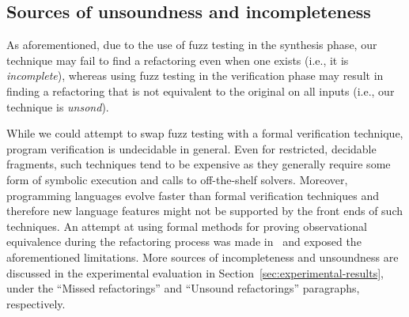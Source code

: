\documentclass[sigconf,review,anonymous]{acmart}
\begin{document}
\subsection{Sources of unsoundness and incompleteness}\label{sec:incompleteness}
As aforementioned, due to the use of fuzz
testing in the synthesis phase, our technique may fail to find a
refactoring even when one exists (i.e., it is {\em incomplete}),
whereas using fuzz testing in the verification phase may result in
finding a refactoring that is not equivalent to the original on all
inputs (i.e., our technique is {\em unsond}).

While we could attempt to swap fuzz testing with a formal verification technique,
program verification is undecidable in general.
Even for restricted, decidable fragments, such
techniques tend to be expensive as they generally require some form of
symbolic execution and calls to off-the-shelf solvers.  Moreover,
programming languages evolve faster than formal verification techniques and
therefore new language features might not be supported by the front ends of
such techniques. An attempt at using formal methods for proving
observational equivalence during the refactoring process was made in~\cite{DBLP:journals/corr/abs-1712-07388} and exposed the aforementioned limitations.
%
More sources of incompleteness and unsoundness are discussed in the experimental evaluation in Section~\ref{sec:experimental-results},
under the ``Missed refactorings'' and ``Unsound refactorings'' paragraphs, respectively.





\end{document}
